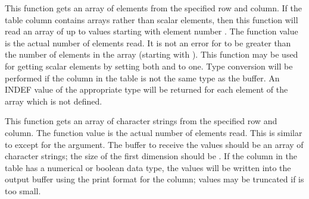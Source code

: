 This function gets an array of elements from the specified row and column.
If the table column contains arrays rather than scalar elements,
then this function will read an array of up to  values
starting with element number .
The function value is the actual number of elements read.
It is not an error for  to be greater than
the number of elements in the array (starting with ).
This function may be used for getting scalar elements
by setting both  and  to one.
Type conversion will be performed
if the column in the table is not the same type as the buffer.
An INDEF value of the appropriate type
will be returned for each element of the array which is not defined.

\callseqfcn

\begin{callseq}
\end{callseq}

This function gets an array of character strings
from the specified row and column.
The function value is the actual number of elements read.
This is similar to  except for the  argument.
The buffer to receive the values should be an array of character strings;
the size of the first dimension should be .
If the column in the table has a numerical or boolean data type,
the values will be written into the output buffer
using the print format for the column;
values may be truncated if  is too small.

\callseqfcn

\begin{callseq}
\end{callseq}

